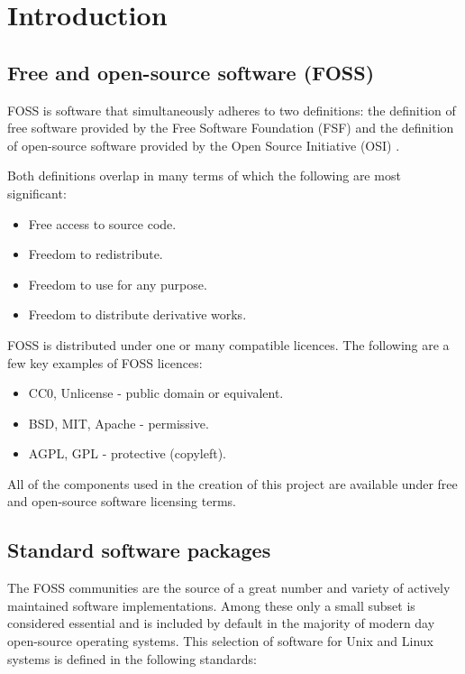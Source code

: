\section{Introduction}\label{Introduction}

\subsection{Free and open-source software (FOSS)}

FOSS is software that simultaneously adheres to two definitions: the definition of free software provided by the Free Software Foundation (FSF) \cite{fsf} and the definition of open-source software provided by the Open Source Initiative (OSI) \cite{osi}.

Both definitions overlap in many terms of which the following are most significant:

\begin{itemize}
    \item Free access to source code.
    \item Freedom to redistribute.
    \item Freedom to use for any purpose.
    \item Freedom to distribute derivative works.
\end{itemize}

FOSS is distributed under one or many compatible licences. The following are a few key examples of FOSS licences:

\begin{itemize}
    \item CC0, Unlicense - public domain or equivalent.
    \item BSD, MIT, Apache - permissive.
    \item AGPL, GPL - protective (copyleft).
\end{itemize}

All of the components used in the creation of this project are available under free and open-source software licensing terms.

\subsection{Standard software packages}

The FOSS communities are the source of a great number and variety of actively maintained software implementations. Among these only a small subset is considered essential and is included by default in the majority of modern day open-source operating systems. This selection of software for Unix and Linux systems is defined in the following standards:

